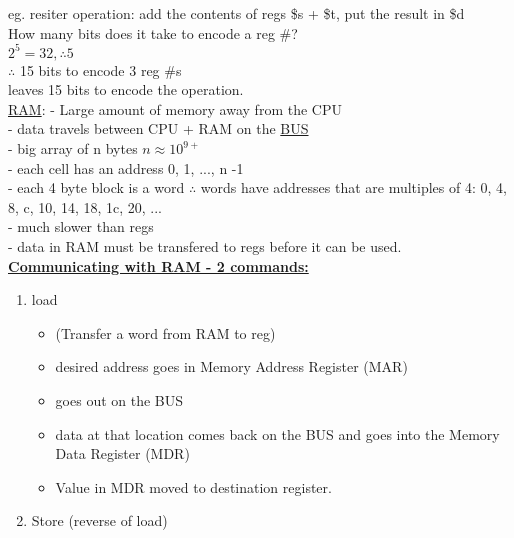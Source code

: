 \documentclass[12pt]{article}
\newcommand{\myt}[1]{\textbf{\underline{#1}}}
\begin{document}
	eg. resiter operation: add the contents of regs \$s + \$t, put the result in \$d\\
	
	How many bits does it take to encode a reg \#?\\
	$2^5 = 32, \therefore 5$\\
	$\therefore$ 15 bits to encode 3 reg \#s\\
	leaves 15 bits to encode the operation.\\
	
	\underline{RAM}:
	- Large amount of memory away from the CPU\\
	- data travels between CPU + RAM on the \underline{BUS}\\
	- big array of n bytes $n \approx 10^{9+}$\\
	- each cell has an address 0, 1, ..., n -1\\
	- each 4 byte block is a word
	$\therefore$ words have addresses that are multiples of 4: 0, 4, 8, c, 10, 14, 18, 1c, 20, ...\\
	- much slower than regs\\
	- data in RAM must be transfered to regs before it can be used.\\
	\myt{Communicating with RAM - 2 commands:}\\
	\begin{enumerate}
		\item load 
		\begin{itemize}
			\item (Transfer a word from RAM to reg)
			\item desired address goes in Memory Address Register (MAR)
			\item goes out on the BUS
			\item data at that location comes back on the BUS and goes into the Memory Data Register (MDR)
			\item Value in MDR moved to destination register.
		\end{itemize}
		\item Store (reverse of load)
	\end{enumerate}
	
\end{document}
